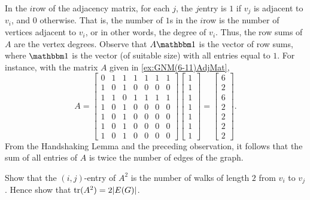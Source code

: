 In the $i$\th row of the adjacency matrix, for each $j$, the $j$\th entry is $1$ if $v_j$ is adjacent to $v_i$, and $0$ otherwise. That is, the number of $1$s in the $i$\th row is the number of vertices adjacent to $v_i$, or in other words, the degree of $v_i$. Thus, the row sums of $A$ are the vertex degrees. Observe that $A \mathbbm 1$ is the vector of row sums, where $\mathbbm 1$ is the vector (of suitable size) with all entries equal to $1$. For instance, with the matrix $A$ given in \cref{ex:GNM(6-11)AdjMat},
\begin{equation*}
A = \begin{bmatrix}
0 & 1 & 1 & 1 & 1 & 1 & 1 \\
1 & 0 & 1 & 0 & 0 & 0 & 0 \\
1 & 1 & 0 & 1 & 1 & 1 & 1 \\
1 & 0 & 1 & 0 & 0 & 0 & 0 \\
1 & 0 & 1 & 0 & 0 & 0 & 0 \\
1 & 0 & 1 & 0 & 0 & 0 & 0 \\
1 & 0 & 1 & 0 & 0 & 0 & 0
\end{bmatrix}
\begin{bmatrix}
1 \\ 1 \\ 1 \\ 1 \\ 1 \\ 1 \\ 1
\end{bmatrix} =
\begin{bmatrix}
6 \\ 2 \\ 6 \\ 2 \\ 2 \\ 2 \\ 2
\end{bmatrix}.
\end{equation*}
From the Handshaking Lemma and the preceding observation, it follows that the sum of all entries of $A$ is twice the number of edges of the graph.

\begin{Exercise}\label{exer:A2ij}
Show that the $(i,j)$-entry of $A^2$ is the number of walks of length $2$ from $v_i$ to $v_j$. Hence show that $\trace(A^2) = 2|E(G)|$.\\
\end{Exercise}

